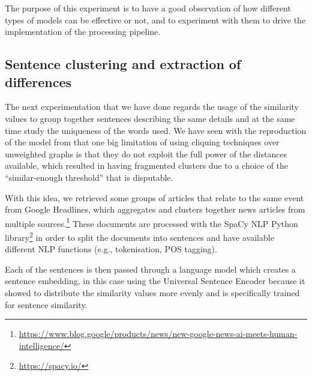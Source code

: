 The purpose of this experiment is to have a good observation of how different types of models can be effective or not, and to experiment with them to drive the implementation of the processing pipeline.


\subsection{Sentence clustering and extraction of differences}
The next experimentation that we have done regards the usage of the similarity values to group together sentences describing the same details and at the same time study the uniqueness of the words used.
We have seen with the reproduction of the model from \citet{bountouridis2018explaining} that one big limitation of using cliquing techniques over unweighted graphs is that they do not exploit the full power of the distances available, which resulted in having fragmented clusters due to a choice of the ``similar-enough threshold'' that is disputable.

With this idea, we retrieved some groups of articles that relate to the same event from Google Headlines, which aggregates and clusters together news articles from multiple sources.\footnote{\url{https://www.blog.google/products/news/new-google-news-ai-meets-human-intelligence/}}
These documents are processed with the SpaCy NLP Python library\footnote{\url{https://spacy.io/}} in order to split the documents into sentences and have available different NLP functions (e.g., tokenisation, POS tagging).

Each of the sentences is then passed through a language model which creates a sentence embedding, in this case using the Universal Sentence Encoder because it showed to distribute the similarity values more evenly and is specifically trained for sentence similarity.

